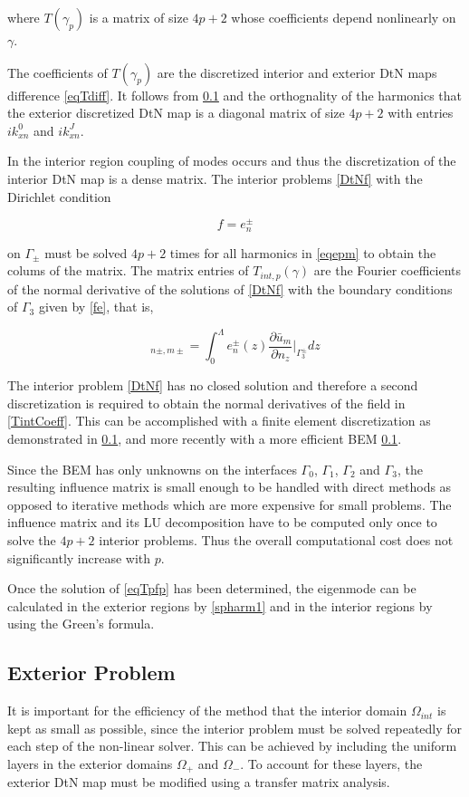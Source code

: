 where $T(\gamma_p)$ is a matrix of size $4p+2$ whose coefficients depend nonlinearly on $\gamma$.

The coefficients of $T(\gamma_p)$ are the discretized interior and
exterior DtN maps difference \ref{eqTdiff}. It follows from \ref{} and
the orthognality of the harmonics that the exterior discretized DtN
map is a diagonal matrix of size $4p+2$ with entries $ik_{xn}^0$ and
$ik_{xn}^J$.

In the interior region coupling of modes occurs and thus the
discretization of the interior DtN map is a dense matrix. The interior
problems \ref{DtNf} with the Dirichlet condition

\begin{equation}
  f = e_n^\pm
\label{fe}
\end{equation} 

on $\Gamma_\pm$ must be solved $4p+2$ times for all harmonics in
\ref{eqepm} to obtain the colums of the matrix. The matrix entries of
$T_{int,p}(\gamma)$ are the Fourier coefficients of the normal
derivative of the solutions of \ref{DtNf} with the boundary conditions of
$\Gamma_3$ given by \ref{fe}, that is,

\begin{equation}
[T_{int,p}(\gamma)]_{n \pm,m \pm} = \int_0^\Lambda e_n^\pm(z)
\frac{\partial \bar{u}_m}{\partial n_z} \bigg|_{\Gamma_3^\pm} dz
\label{TintCoeff}
\end{equation}

The interior problem \ref{DtNf} has no closed solution and therefore a
second discretization is required to obtain the normal derivatives of
the field in \ref{TintCoeff}. This can be accomplished with a finite
element discretization as demonstrated in \ref{}, and more recently
with a more efficient BEM \ref{}.

Since the BEM has only unknowns on the interfaces $\Gamma_0$,
$\Gamma_1$, $\Gamma_2$ and $\Gamma_3$, the resulting influence matrix
is small enough to be handled with direct methods as opposed to
iterative methods which are more expensive for small problems. The
influence matrix and its LU decomposition have to be computed only
once to solve the $4p+2$ interior problems. Thus the overall
computational cost does not significantly increase with $p$.

Once the solution of \ref{eqTpfp} has been determined, the eigenmode can be
calculated in the exterior regions by \ref{spharm1} and in the interior
regions by using the Green's formula.

\subsection{Exterior Problem}
It is important for the efficiency of the method that the interior
domain $\Omega_{int}$ is kept as small as possible, since the interior
problem must be solved repeatedly for each step of the non-linear
solver. This can be achieved by including the uniform layers in the
exterior domains $\Omega_+$ and $\Omega_-$. To account for these
layers, the exterior DtN map must be modified using a transfer matrix
analysis.

